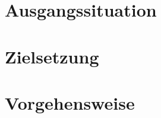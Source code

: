 \section{Ausgangssituation}\label{ausgangssituation}

\section{Zielsetzung}\label{zielsetzung}

\section{Vorgehensweise}\label{vorgehensweise}
